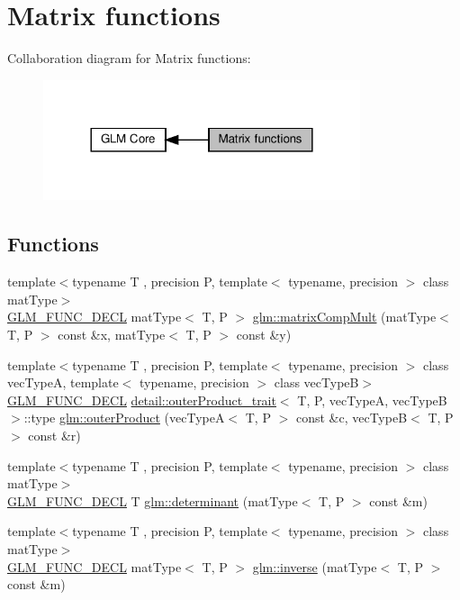 \hypertarget{group__core__func__matrix}{}\section{Matrix functions}
\label{group__core__func__matrix}
Collaboration diagram for Matrix functions\+:\nopagebreak
\begin{figure}[H]
\begin{center}
\leavevmode
\includegraphics[width=264pt]{group__core__func__matrix}
\end{center}
\end{figure}
\subsection*{Functions}
\begin{DoxyCompactItemize}
\item 
{\footnotesize template$<$typename T , precision P, template$<$ typename, precision $>$ class mat\+Type$>$ }\\\hyperlink{setup_8hpp_ab2d052de21a70539923e9bcbf6e83a51}{G\+L\+M\+\_\+\+F\+U\+N\+C\+\_\+\+D\+E\+CL} mat\+Type$<$ T, P $>$ \hyperlink{group__core__func__matrix_ga4a54992e4741188ee624b21e3ba91814}{glm\+::matrix\+Comp\+Mult} (mat\+Type$<$ T, P $>$ const \&x, mat\+Type$<$ T, P $>$ const \&y)
\item 
{\footnotesize template$<$typename T , precision P, template$<$ typename, precision $>$ class vec\+TypeA, template$<$ typename, precision $>$ class vec\+TypeB$>$ }\\\hyperlink{setup_8hpp_ab2d052de21a70539923e9bcbf6e83a51}{G\+L\+M\+\_\+\+F\+U\+N\+C\+\_\+\+D\+E\+CL} \hyperlink{structglm_1_1detail_1_1outer_product__trait}{detail\+::outer\+Product\+\_\+trait}$<$ T, P, vec\+TypeA, vec\+TypeB $>$\+::type \hyperlink{group__core__func__matrix_gae9f513dc8e4f3ceb993669321b6d0f09}{glm\+::outer\+Product} (vec\+TypeA$<$ T, P $>$ const \&c, vec\+TypeB$<$ T, P $>$ const \&r)
\item 
{\footnotesize template$<$typename T , precision P, template$<$ typename, precision $>$ class mat\+Type$>$ }\\\hyperlink{setup_8hpp_ab2d052de21a70539923e9bcbf6e83a51}{G\+L\+M\+\_\+\+F\+U\+N\+C\+\_\+\+D\+E\+CL} T \hyperlink{group__core__func__matrix_ga26ea77c574802bc6fc193c40478718d2}{glm\+::determinant} (mat\+Type$<$ T, P $>$ const \&m)
\item 
{\footnotesize template$<$typename T , precision P, template$<$ typename, precision $>$ class mat\+Type$>$ }\\\hyperlink{setup_8hpp_ab2d052de21a70539923e9bcbf6e83a51}{G\+L\+M\+\_\+\+F\+U\+N\+C\+\_\+\+D\+E\+CL} mat\+Type$<$ T, P $>$ \hyperlink{group__core__func__matrix_ga7635d3dbe5aa10ff73a0e6903bf6bea5}{glm\+::inverse} (mat\+Type$<$ T, P $>$ const \&m)
\end{DoxyCompactItemize}


